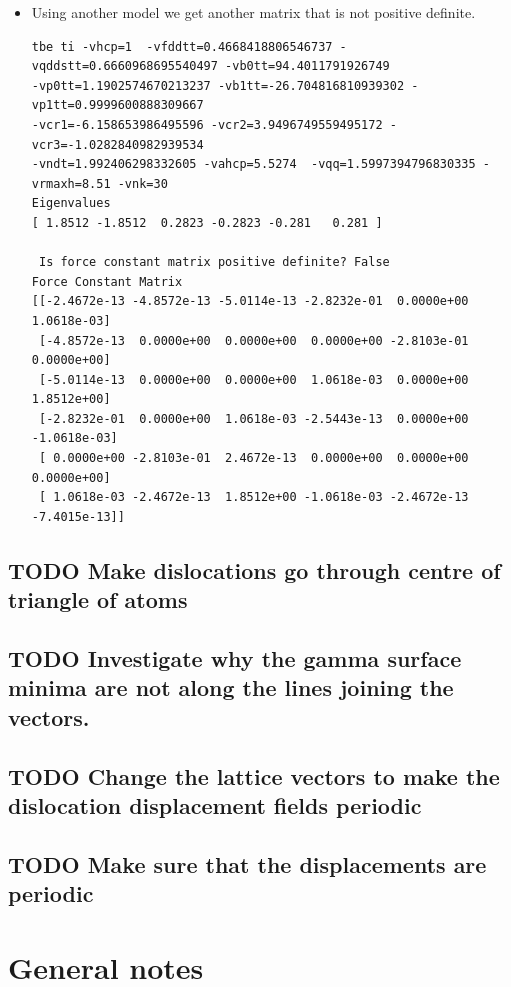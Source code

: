 \documentclass[11pt]{article}
\begin{document}
\begin{itemize}
\item Using another model we get another matrix that is not positive
definite. 
\begin{verbatim}
tbe ti -vhcp=1  -vfddtt=0.4668418806546737 -vqddstt=0.6660968695540497 -vb0tt=94.4011791926749 
-vp0tt=1.1902574670213237 -vb1tt=-26.704816810939302 -vp1tt=0.9999600888309667 
-vcr1=-6.158653986495596 -vcr2=3.9496749559495172 -vcr3=-1.0282840982939534 
-vndt=1.992406298332605 -vahcp=5.5274  -vqq=1.5997394796830335 -vrmaxh=8.51 -vnk=30 
Eigenvalues
[ 1.8512 -1.8512  0.2823 -0.2823 -0.281   0.281 ]

 Is force constant matrix positive definite? False
Force Constant Matrix
[[-2.4672e-13 -4.8572e-13 -5.0114e-13 -2.8232e-01  0.0000e+00  1.0618e-03]
 [-4.8572e-13  0.0000e+00  0.0000e+00  0.0000e+00 -2.8103e-01  0.0000e+00]
 [-5.0114e-13  0.0000e+00  0.0000e+00  1.0618e-03  0.0000e+00  1.8512e+00]
 [-2.8232e-01  0.0000e+00  1.0618e-03 -2.5443e-13  0.0000e+00 -1.0618e-03]
 [ 0.0000e+00 -2.8103e-01  2.4672e-13  0.0000e+00  0.0000e+00  0.0000e+00]
 [ 1.0618e-03 -2.4672e-13  1.8512e+00 -1.0618e-03 -2.4672e-13 -7.4015e-13]]
\end{verbatim}
\end{itemize}

\subsection{{\bfseries\sffamily TODO} Make dislocations go through centre of triangle of atoms}
\label{sec-1-11}

\subsection{{\bfseries\sffamily TODO} Investigate why the gamma surface minima are not along the lines joining the vectors.}
\label{sec-1-12}

\subsection{{\bfseries\sffamily TODO} Change the lattice vectors to make the dislocation displacement fields periodic}
\label{sec-1-13}

\subsection{{\bfseries\sffamily TODO} Make sure that the displacements are periodic}
\label{sec-1-14}


\section{General notes}
\label{sec-2}
\end{document}
